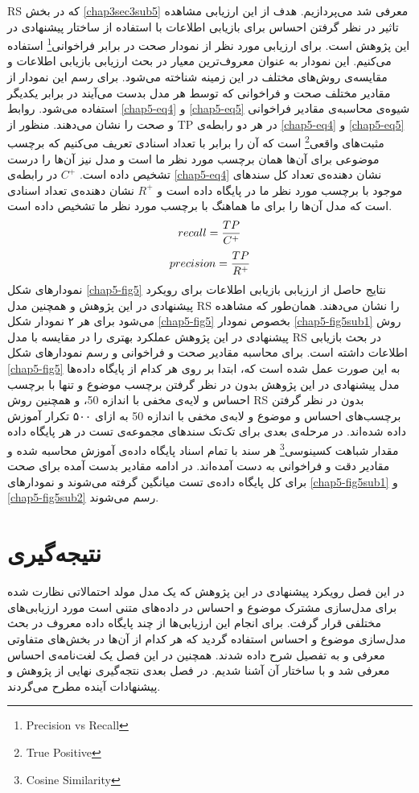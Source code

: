 RS
که در بخش
\ref{chap3sec3sub5}
معرفی‌ شد می‌‌پردازیم. هدف از این ارزیابی مشاهده تاثیر در نظر گرفتن احساس برای بازیابی اطلاعات با استفاده از ساختار پیشنهادی در این پژوهش است. برای ارزیابی مورد نظر از نمودار صحت در برابر فراخوانی\footnote{Precision vs Recall}
استفاده می‌‌کنیم. این نمودار به عنوان معروف‌ترین معیار در بحث ارزیابی بازیابی اطلاعات و مقایسه‌ی روش‌های مختلف در این زمینه شناخته می‌‌شود. برای رسم این نمودار از مقادیر مختلف صحت و فراخوانی که توسط هر مدل بدست می‌‌آیند در برابر یکدیگر استفاده می‌‌شود. روابط
\ref{chap5-eq4}
و
\ref{chap5-eq5}
شیوه‌ی محاسبه‌ی مقادیر فراخوانی و صحت را نشان می‌‌دهند. منظور از
TP
در هر دو رابطه‌ی
\ref{chap5-eq4}
و
\ref{chap5-eq5}
مثبت‌های واقعی‌\footnote{True Positive}
 است که آن را برابر با تعداد اسنادی تعریف می‌‌کنیم که برچسب موضوعی برای آن‌ها همان برچسب مورد نظر ما است و مدل نیز آن‌ها را 
درست تشخیص داده است.
$C^+$
در رابطه‌ی
\ref{chap5-eq4}
نشان دهنده‌ی تعداد کل سندهای موجود با برچسب مورد نظر ما در پایگاه داده است و
$R^+$
نشان دهنده‌ی تعداد اسنادی است که مدل آن‌ها را برای ما هماهنگ با برچسب مورد نظر ما تشخیص داده است.
\begin{align}
	\centering
	\label{chap5-eq4}
	recall = \dfrac{TP}{C^+}
\end{align}
\begin{align}
	\centering
	\label{chap5-eq5}
	precision = \dfrac{TP}{R^+}
\end{align}
نمودار‌های شکل
\ref{chap5-fig5}
نتایج حاصل از ارزیابی بازیابی اطلاعات برای رویکرد پیشنهادی در این پژوهش و همچنین مدل
RS
را نشان می‌‌دهند. همان‌طور که مشاهده می‌‌شود برای هر ۲ نمودار شکل
\ref{chap5-fig5}
بخصوص نمودار
\ref{chap5-fig5sub1}
روش پیشنهادی در این پژوهش عملکرد بهتری را در مقایسه با مدل
RS
در بحث بازیابی اطلاعات داشته است. برای محاسبه مقادیر صحت و فراخوانی و رسم نمودار‌های شکل
\ref{chap5-fig5}
به این صورت عمل شده است که، ابتدا بر روی هر کدام از پایگاه داده‌ها مدل پیشنهادی در این پژوهش بدون در نظر گرفتن برچسب موضوع و تنها با برچسب احساس و لایه‌ی مخفی با اندازه 50، و همچنین روش
RS
بدون در نظر گرفتن برچسب‌های احساس و موضوع و لابه‌ی مخفی با اندازه 50 به ازای ۵۰۰ تکرار آموزش داده شده‌اند. در مرحله‌ی بعدی برای تک‌تک سند‌های مجموعه‌ی تست در هر پایگاه داده مقدار شباهت کسینوسی\footnote{Cosine Similarity}
هر سند با تمام اسناد پایگاه داده‌ی آموزش محاسبه شده و مقادیر دقت و فراخوانی به دست آمده‌اند. در ادامه مقادیر بدست آمده برای صحت برای کل پایگاه داده‌ی تست میانگین گرفته می‌‌شوند و نمودار‌های
\ref{chap5-fig5sub1}
و
\ref{chap5-fig5sub2}
رسم می‌‌شوند.

\section{نتیجه‌گیری}
در این فصل رویکرد پیشنهادی در این پژوهش که یک مدل مولد احتمالاتی نظارت شده برای مدل‌سازی مشترک موضوع و احساس در داده‌های متنی است مورد ارزیابی‌های مختلفی‌ قرار گرفت.  برای انجام این ارزیابی‌ها از چند پایگاه داده معروف در بحث مدل‌سازی موضوع و احساس استفاده گردید که هر کدام از آن‌ها در بخش‌های متفاوتی معرفی‌ و به تفصیل شرح داده شدند. همچنین در این فصل یک لغت‌نامه‌ی احساس معرفی‌ شد و با ساختار آن آشنا شدیم. در فصل بعدی نتجه‌گیری نهایی از پژوهش و پیشنهادات آینده مطرح می‌گردند.
